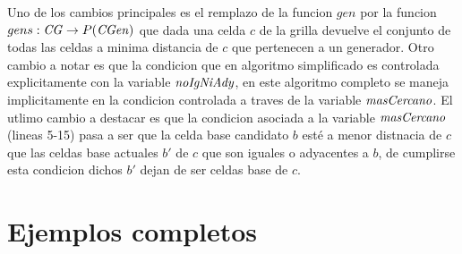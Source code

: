 \newpage
Uno de los cambios principales es el remplazo de la funcion $gen$ por la
funcion $gens : \mathit{CG} \rightarrow P(\mathit{CGen})$ que dada una celda $c$ de
la grilla devuelve el conjunto de todas las celdas a minima distancia de $c$ que pertenecen a
un generador. Otro cambio a notar es que la condicion que en algoritmo
simplificado es controlada explicitamente con la variable $\mathit{noIgNiAdy}$, en
este algoritmo completo se maneja implicitamente en la condicion controlada
a traves de la variable $\mathit{masCercano}$. El utlimo cambio a destacar es que la
condicion asociada a la variable $\mathit{masCercano}$ (lineas 5-15) pasa a
ser que la celda base candidato $b$ esté a menor distnacia de $c$ que las
celdas base actuales $b'$ de $c$ que son iguales o adyacentes a $b$, de cumplirse esta
condicion dichos $b'$ dejan de ser celdas base de $c$.
\newpage

\chapter{Ejemplos completos}
